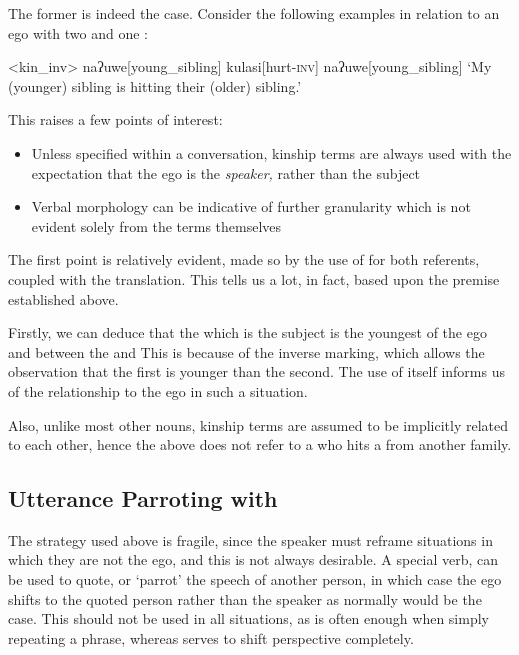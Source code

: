 The former is indeed the case. Consider the following examples in relation to an ego with two  and one :

\ex<kin_inv>
\begingl
naʔuwe[young\_sibling]
kulasi[hurt\textsc{-inv}]
naʔuwe[young\_sibling]
\glft `My (younger) sibling is hitting their (older) sibling.'
\endgl
\xe


This raises a few points of interest:
\begin{itemize}
  \item Unless specified within a conversation, kinship terms are always used with the expectation that the ego is the \textit{speaker,} rather than the subject
  \item Verbal morphology can be indicative of further granularity which is not evident solely from the terms themselves
\end{itemize}

The first point is relatively evident, made so by the use of  for both referents, coupled with the translation. This tells us a lot, in fact, based upon the premise established above.

Firstly, we can deduce that the  which is the subject is the youngest of the ego and between the  and  This is because of the inverse marking, which allows the observation that the first  is younger than the second. The use of  itself informs us of the relationship to the ego in such a situation.

Also, unlike most other nouns, kinship terms are assumed to be implicitly related to each other, hence the above does not refer to a  who hits a  from another family.

\subsection{Utterance Parroting with }
The strategy used above is fragile, since the speaker must reframe situations in which they are not the ego, and this is not always desirable. A special verb,  can be used to quote, or `parrot' the speech of another person, in which case the ego shifts to the quoted person rather than the speaker as normally would be the case. This should not be used in all situations, as  is often enough when simply repeating a phrase, whereas  serves to shift perspective completely.


